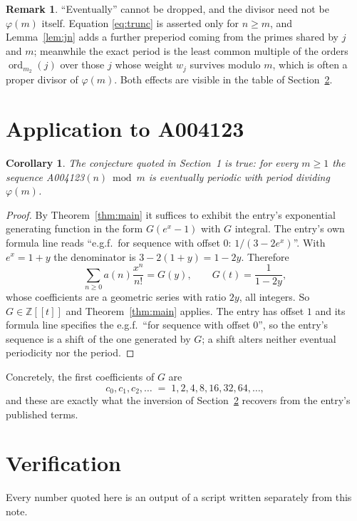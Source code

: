 \documentclass[11pt,a4paper]{article}
\theoremstyle{plain}
\newtheorem{corollary}[theorem]{Corollary}
\theoremstyle{definition}
\newtheorem{remark}[theorem]{Remark}
\newcommand{\ord}{\operatorname{ord}}
\newcommand{\Z}{\mathbb{Z}}
\begin{document}
\begin{remark}
``Eventually'' cannot be dropped, and the divisor need not be $\varphi(m)$ itself.
Equation \eqref{eq:trunc} is asserted only for $n\ge m$, and Lemma~\ref{lem:jn} adds a
further preperiod coming from the primes shared by $j$ and $m$; meanwhile the exact period
is the least common multiple of the orders $\ord_{m_{2}}(j)$ over those $j$ whose weight
$w_{j}$ survives modulo $m$, which is often a proper divisor of $\varphi(m)$. Both effects
are visible in the table of Section~\ref{sec:ver}.
\end{remark}

\section{Application to A004123}\label{sec:apply}

\begin{corollary}\label{cor:this}
The conjecture quoted in Section~1 is true: for every $m\ge1$ the sequence
A004123$(n) \bmod m$ is eventually periodic with period dividing $\varphi(m)$.
\end{corollary}

\begin{proof}
By Theorem~\ref{thm:main} it suffices to exhibit the entry's exponential generating
function in the form $G(e^{x}-1)$ with $G$ integral. The entry's own formula line reads ``e.g.f.\ for sequence with offset $0$: $1/(3-2e^{x})$''. With $e^{x}=1+y$ the denominator is $3-2(1+y)=1-2y$. Therefore
\[
\sum_{n\ge0}a(n)\frac{x^{n}}{n!}=G(y),\qquad G(t)=\frac{1}{1-2y} ,
\]
whose coefficients are a geometric series with ratio $2y$, all integers. So $G\in\Z[[t]]$ and
Theorem~\ref{thm:main} applies. The entry has offset $1$ and its formula line specifies the e.g.f.\ ``for sequence with offset $0$'', so the entry's sequence is a shift of the one generated by $G$; a shift alters neither eventual periodicity nor the period.
\end{proof}

Concretely, the first coefficients of $G$ are
\[
c_{0},c_{1},c_{2},\dots \;=\; 1, 2, 4, 8, 16, 32, 64, \dots ,
\]
and these are exactly what the inversion of Section~\ref{sec:ver} recovers from the
entry's published terms.

\section{Verification}\label{sec:ver}

Every number quoted here is an output of a script written separately from this note.
\end{document}
